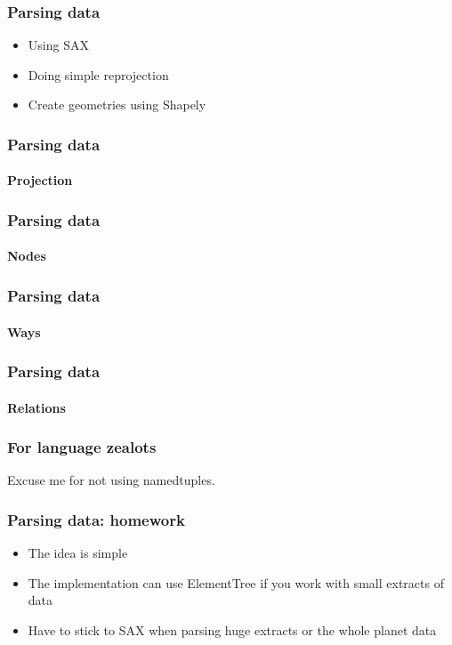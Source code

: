 \documentclass[14pt]{beamer}
\begin{document}
\begin{frame}
  \frametitle{Parsing data}
  \begin{itemize}
    \item Using SAX
    \item Doing simple reprojection
    \item Create geometries using Shapely
  \end{itemize}
\end{frame}

\begin{frame}
  \frametitle{Parsing data}
  \framesubtitle{Projection}
  
\end{frame}

\begin{frame}
  \frametitle{Parsing data}
  \framesubtitle{Nodes}
\end{frame}

\begin{frame}
  \frametitle{Parsing data}
  \framesubtitle{Ways}
\end{frame}

\begin{frame}
  \frametitle{Parsing data}
  \framesubtitle{Relations}
\end{frame}

\begin{frame}
  \frametitle{For language zealots}
  \begin{center}
    \LARGE{Excuse me for not using namedtuples.}
  \end{center}
\end{frame}

\begin{frame}
  \frametitle{Parsing data: homework}
  \begin{itemize}
  \item The idea is simple
  \item The implementation can use ElementTree if you work with
    small extracts of data
  \item Have to stick to SAX when parsing huge extracts or
    the whole planet data
  \end{itemize}
\end{frame}
\end{document}
